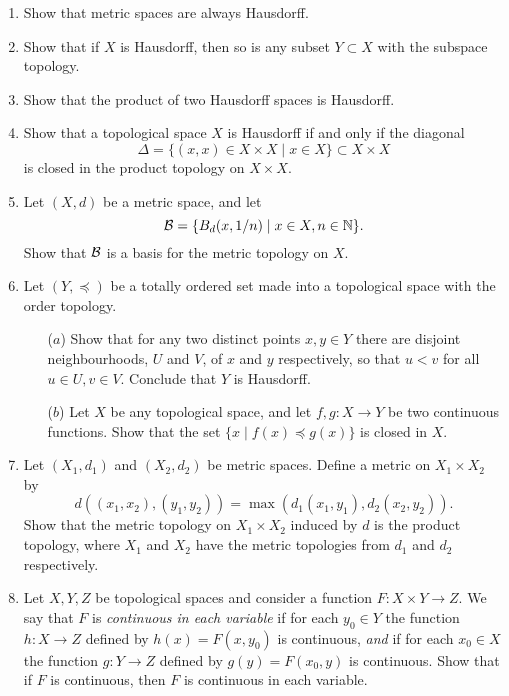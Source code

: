 \begin{enumerate}[label=1.\arabic*]
  \item \label{metric-Hausdorff} Show that metric spaces are always Hausdorff.
  
  \item \label{subspace-Hausdorff} Show that if $X$ is Hausdorff, then so is any subset $Y\subset X$ with the subspace topology.
  
  \item \label{products-Hausdorff} Show that the product of two Hausdorff spaces is Hausdorff.
  
  \item Show that a topological space $X$ is Hausdorff if and only if the diagonal
  \[
    \Delta = \{(x,x) \in X \times X \mid x \in X \} \subset X \times X
  \]
  is closed in the product topology on $X \times X$.
  
  \item \label{metric-first-countable} Let $(X,d)$ be a metric space, and let
  \[
    \mathcal{B} = \{ B_d(x,1/n) \mid x \in X, n \in \mathbb{N} \}.
  \]
  Show that $\mathcal{B}$ is a basis for the metric topology on $X$.
  
  \item Let $(Y,\preceq)$ be a totally ordered set made into a topological space with the order topology.
  \begin{itemize}
    \item[($a$)] Show that for any two distinct points $x, y \in Y$ there are disjoint neighbourhoods, $U$ and $V$, of $x$ and $y$ respectively, so that $u < v$ for all $u \in U, v \in V$. Conclude that $Y$ is Hausdorff.
    \item[($b$)] Let $X$ be any topological space, and let $f,g:X\to Y$ be two continuous functions. Show that the set $\{x \mid f(x)\preceq g(x)\}$ is closed in $X$.
  \end{itemize}
  
  \item \label{product-metric}Let $(X_1,d_1)$ and $(X_2,d_2)$ be metric spaces. Define a metric on $X_1 \times X_2$ by
	\[
	  d((x_1,x_2),(y_1,y_2)) = \max(d_1(x_1,y_1),d_2(x_2,y_2)).
  \]
  Show that the metric topology on $X_1 \times X_2$ induced by $d$ is the product topology, where $X_1$ and $X_2$ have the metric topologies from $d_1$ and $d_2$ respectively.

  
  \item Let $X,Y,Z$ be topological spaces and consider a function $F:X\times Y\rightarrow Z$. We say that $F$ is \emph{continuous in each variable} if for each $y_0\in Y$ the function $h:X\rightarrow Z$ defined by $h(x)=F(x,y_0)$ is continuous, \emph{and} if for each $x_0\in X$ the function $g:Y\rightarrow Z$ defined by $g(y) = F(x_0,y)$ is continuous. Show that if $F$ is continuous, then $F$ is continuous in each variable.
  

\end{enumerate}
